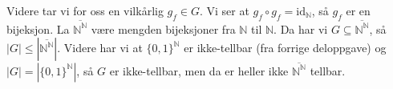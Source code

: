 \documentclass{article}[norsk]
\begin{document}
Videre tar vi for oss en vilkårlig $g_f\in G$. Vi ser at $g_f\circ g_f=\text{id}_\mathbb{N}$, så $g_f$ er en bijeksjon. La $\overline{\mathbb{N}^\mathbb{N}}$ være mengden bijeksjoner fra $\mathbb{N}$ til $\mathbb{N}$. Da har vi $G\subseteq \overline{\mathbb{N}^\mathbb{N}}$, så $|G|\leq\left|\overline{\mathbb{N}^\mathbb{N}}\right|$. Videre har vi at $\{0,1\}^\mathbb{N}$ er ikke-tellbar (fra forrige deloppgave) og $|G|=\left|\{0,1\}^\mathbb{N}\right|$, så $G$ er ikke-tellbar, men da er heller ikke $\overline{\mathbb{N}^\mathbb{N}}$ tellbar.
\end{document}

